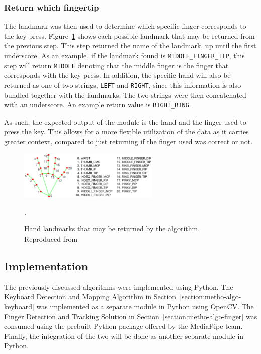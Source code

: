\documentclass{report}
\begin{document}
\subsubsection{Return which fingertip}
The landmark was then used to determine which specific finger corresponds to the
key press. Figure~\ref{fig:metho-algo-integration-landmarks} shows each possible
landmark that may be returned from the previous step. This step returned the
name of the landmark, up until the first underscore. As an example, if the
landmark found is \texttt{MIDDLE\_FINGER\_TIP}, this step will return
\texttt{MIDDLE} denoting that the middle finger is the finger that corresponds
with the key press. In addition, the specific hand will also be returned as one
of two strings, \texttt{LEFT} and \texttt{RIGHT}, since this information is also
bundled together with the landmarks. The two strings were then concatenated with
an underscore. An example return value is \texttt{RIGHT\_RING}.

As such, the expected output of the module is the hand and the finger used to
press the key. This allows for a more flexible utilization of the data as it
carries greater context, compared to just returning if the finger used was
correct or not.

\begin{figure}[H]
	\centering
	\includegraphics[width=0.6\textwidth]{hand-landmarks.png}
	\caption{Hand landmarks that may be returned by the algorithm. Reproduced from }.
	\label{fig:metho-algo-integration-landmarks}
	\centering
\end{figure}

\subsection{Implementation}
\label{section:metho-algo-implementation}
The previously discussed algorithms were implemented using Python. The Keyboard
Detection and Mapping Algorithm in Section~\ref{section:metho-algo-keyboard} was
implemented as a separate module in Python using OpenCV. The Finger Detection
and Tracking Solution in Section~\ref{section:metho-algo-finger} was consumed
using the prebuilt Python package offered by the MediaPipe team. Finally, the
integration of the two will be done as another separate module in Python.
\end{document}
